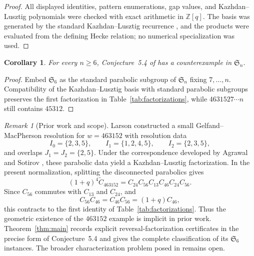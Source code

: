 \documentclass[11pt]{amsart}
\newtheorem{corollary}[theorem]{Corollary}
\theoremstyle{remark}
\newtheorem{remark}[theorem]{Remark}
\newcommand{\Ssix}{\mathfrak S_6}
\newcommand{\Ct}{\widetilde C}
\newcommand{\Cab}[2]{C_{#1#2}}
\begin{document}
\begin{proof}
All displayed identities, pattern enumerations, gap values, and
Kazhdan--Lusztig polynomials were checked with exact arithmetic in
$\mathbb Z[q]$. The basis was generated by the standard
Kazhdan--Lusztig recurrence \cite[Chap.~5]{BjornerBrenti}, and the
products were evaluated from the defining Hecke relation; no numerical
specialization was used.
\end{proof}

\begin{corollary}\label{cor:alln}
For every $n\geq6$, Conjecture~5.4 of \cite{ParisiEtAl} has a
counterexample in $\mathfrak S_n$.
\end{corollary}

\begin{proof}
Embed $\Ssix$ as the standard parabolic subgroup of $\mathfrak S_n$
fixing $7,\ldots,n$. Compatibility of the Kazhdan--Lusztig basis with
standard parabolic subgroups preserves the first factorization in
Table~\ref{tab:factorizations}, while
$4631527\cdots n$ still contains $45312$.
\end{proof}

\begin{remark}[Prior work and scope]\label{rem:prior}
Larson \cite[Ex.~6.11]{Larson} constructed a small
Gelfand--MacPherson resolution for $w=463152$ with resolution data
\[
I_0=\{2,3,5\},\qquad I_1=\{1,2,4,5\},\qquad
I_2=\{2,3,5\},
\]
and overlaps $J_1=J_2=\{2,5\}$. Under the correspondence developed
by Agrawal and Sotirov
\cite[Cor.~6.21 and Sec.~8]{AgrawalSotirov}, these parabolic data
yield a Kazhdan--Lusztig factorization. In the present normalization,
splitting the disconnected parabolics gives
\[
(1+q)^4\Ct_{463152}
 =\Cab{2}{4}\Cab{5}{6}\Cab{1}{3}\Cab{4}{6}
  \Cab{2}{4}\Cab{5}{6}.
\]
Since $\Cab{5}{6}$ commutes with $\Cab{1}{3}$ and $\Cab{2}{4}$, and
\[
\Cab{5}{6}\Cab{4}{6}
 =\Cab{4}{6}\Cab{5}{6}
 =(1+q)\Cab{4}{6},
\]
this contracts to the first identity of
Table~\ref{tab:factorizations}. Thus the geometric existence of the
$463152$ example is implicit in prior work.
Theorem~\ref{thm:main} records explicit reversal-factorization
certificates in the precise form of Conjecture~5.4 and gives the
complete classification of its $\Ssix$ instances. The broader
characterization problem posed in \cite[Quest.~4.5]{Skandera}
remains open.
\end{remark}
\end{document}
